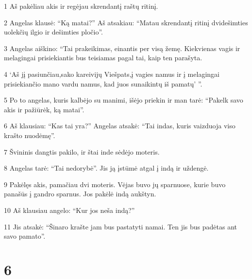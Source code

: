 \par 1 Aš pakėliau akis ir regėjau skrendantį raštų ritinį. 
\par 2 Angelas klausė: “Ką matai?” Aš atsakiau: “Matau skrendantį ritinį dvidešimties uolekčių ilgio ir dešimties pločio”. 
\par 3 Angelas aiškino: “Tai prakeikimas, einantis per visą žemę. Kiekvienas vagis ir melagingai prisiekiantis bus teisiamas pagal tai, kaip ten parašyta. 
\par 4 ‘Aš jį pasiunčiau,­sako kareivijų Viešpats,­į vagies namus ir į melagingai prisiekiančio mano vardu namus, kad juos sunaikintų iš pamatų’ ”. 
\par 5 Po to angelas, kuris kalbėjo su manimi, išėjo priekin ir man tarė: “Pakelk savo akis ir pažiūrėk, ką matai”. 
\par 6 Aš klausiau: “Kas tai yra?” Angelas atsakė: “Tai indas, kuris vaizduoja viso krašto nuodėmę”. 
\par 7 Švininis dangtis pakilo, ir štai inde sėdėjo moteris. 
\par 8 Angelas tarė: “Tai nedorybė”. Jis ją įstūmė atgal į indą ir uždengė. 
\par 9 Pakėlęs akis, pamačiau dvi moteris. Vėjas buvo jų sparnuose, kurie buvo panašūs į gandro sparnus. Jos pakėlė indą aukštyn. 
\par 10 Aš klausiau angelo: “Kur jos neša indą?” 
\par 11 Jis atsakė: “Šinaro krašte jam bus pastatyti namai. Ten jis bus padėtas ant savo pamato”.



\chapter{6}


